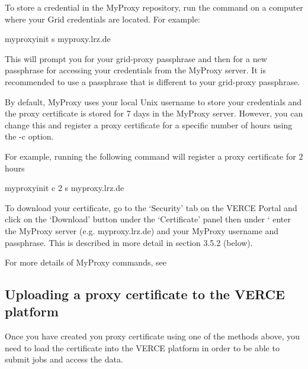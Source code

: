 \documentclass[english]{book}
\begin{document}
To store a credential in the MyProxy repository, run the 
command on a computer where your Grid credentials are located. For
example:

%
\begin{sphinxVerbatim}[commandchars=\\\{\}]
myproxy\PYGZhy{}init \PYGZhy{}s myproxy.lrz.de
\end{sphinxVerbatim}

This will prompt you for your grid-proxy passphrase and then for a new
passphrase for accessing your credentials from the MyProxy server. It is
recommended to use a passphrase that is different to your grid-proxy
passphrase.

By default, MyProxy uses your local Unix username to store your
credentials and the proxy certificate is stored for 7 days in the
MyProxy server. However, you can change this and register a proxy
certificate for a specific number of hours using the -c option.

For example, running the following command will register a proxy
certificate for 2 hours

%
\begin{sphinxVerbatim}[commandchars=\\\{\}]
myproxy\PYGZhy{}init \PYGZhy{}c 2 \PYGZhy{}s myproxy.lrz.de
\end{sphinxVerbatim}

To download your certificate, go to the ‘Security’ tab on the VERCE
Portal and click on the ‘Download’ button under the ‘Certificate’ panel
then under ‘ enter the MyProxy server (e.g.
myproxy.lrz.de) and your MyProxy username and passphrase. This is
described in more detail in section 3.5.2 (below).

For more details of MyProxy commands, see



\subsection{Uploading a proxy certificate to the VERCE platform}
\label{\detokenize{Section3:uploading-a-proxy-certificate-to-the-verce-platform}}
Once you have created you proxy certificate using one of the methods
above, you need to load the certificate into the VERCE platform in order
to be able to submit jobs and access the data.
\end{document}
